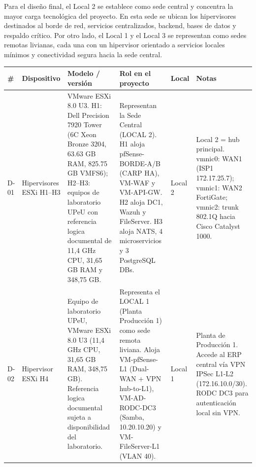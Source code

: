 \documentclass[11pt, a4paper, oneside]{report}
\begin{document}
Para el diseño final, el Local 2 se establece como sede central y concentra la mayor carga tecnológica del proyecto. En esta sede se ubican los hipervisores destinados al borde de red, servicios centralizados, backend, bases de datos y respaldo crítico. Por otro lado, el Local 1 y el Local 3 se representan como sedes remotas livianas, cada una con un hipervisor orientado a servicios locales mínimos y conectividad segura hacia la sede central.

\begin{landscape}
\thispagestyle{fancy}

\begin{table}[p]
  \centering
  \renewcommand{\arraystretch}{1.3}
  \small

  \begin{tabularx}{0.98\linewidth}{@{}|C{1.1cm}|L{3.3cm}|L{4.4cm}|X|C{2.3cm}|L{4.5cm}|@{}}

    \parbox[c][1.1cm][c]{\linewidth}{\centering\color{white}\bfseries\small \#} &
    \parbox[c][1.1cm][c]{\linewidth}{\centering\color{white}\bfseries\small Dispositivo} &
    \parbox[c][1.1cm][c]{\linewidth}{\centering\color{white}\bfseries\small Modelo / versión} &
    \parbox[c][1.1cm][c]{\linewidth}{\centering\color{white}\bfseries\small Rol en el proyecto} &
    \parbox[c][1.1cm][c]{\linewidth}{\centering\color{white}\bfseries\small Local} &
    \parbox[c][1.1cm][c]{\linewidth}{\centering\color{white}\bfseries\small Notas} \\ \hline

    {\small D-01} &
    {\small Hipervisores ESXi H1--H3} &
    {\small VMware ESXi 8.0 U3. H1: Dell Precision 7920 Tower (6C Xeon Bronze 3204, 63.63 GB RAM, 825.75 GB VMFS6); H2--H3: equipos de laboratorio UPeU con referencia logica documental de 11,4 GHz CPU, 31,65 GB RAM y 348,75 GB.} &
    {\small Representan la Sede Central (LOCAL 2). H1 aloja pfSense-BORDE-A/B (CARP HA), VM-WAF y VM-API-GW. H2 aloja DC1, Wazuh y FileServer. H3 aloja NATS, 4 microservicios y 3 PostgreSQL DBs.} &
    {\small Local 2} &
    {\small Local 2 = hub principal. vmnic0: WAN1 (ISP1 172.17.25.7); vmnic1: WAN2 FortiGate; vmnic2: trunk 802.1Q hacia Cisco Catalyst 1000.} \\ \hline

    {\small D-02} &
    {\small Hipervisor ESXi H4} &
    {\small Equipo de laboratorio UPeU, VMware ESXi 8.0 U3 (11,4 GHz CPU, 31,65 GB RAM, 348,75 GB). Referencia logica documental sujeta a disponibilidad del laboratorio.} &
    {\small Representa el LOCAL 1 (Planta Producción 1) como sede remota liviana. Aloja VM-pfSense-L1 (Dual-WAN + VPN hub-to-L1), VM-AD-RODC-DC3 (Samba, 10.20.10.20) y VM-FileServer-L1 (VLAN 40).} &
    {\small Local 1} &
    {\small Planta de Producción 1. Accede al ERP central vía VPN IPSec L1-L2 (172.16.10.0/30). RODC DC3 para autenticación local sin VPN.} \\ \hline


\end{tabularx}
\end{table}
\end{landscape}
\end{document}
